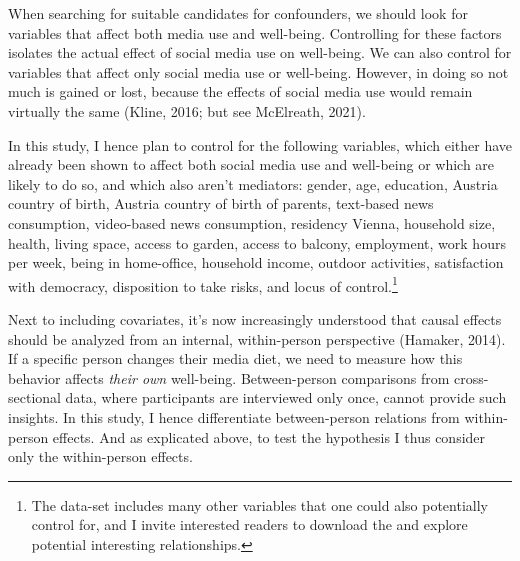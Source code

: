 \documentclass[
  man,mask]{apa7}
\begin{document}
When searching for suitable candidates for confounders, we should look for variables that affect both media use and well-being.
Controlling for these factors isolates the actual effect of social media use on well-being.
We can also control for variables that affect only social media use or well-being.
However, in doing so not much is gained or lost, because the effects of social media use would remain virtually the same (Kline, 2016; but see McElreath, 2021).

In this study, I hence plan to control for the following variables, which either have already been shown to affect both social media use and well-being or which are likely to do so, and which also aren't mediators:
gender, age, education, Austria country of birth, Austria country of birth of parents, text-based news consumption, video-based news consumption, residency Vienna, household size, health, living space, access to garden, access to balcony, employment, work hours per week, being in home-office, household income, outdoor activities, satisfaction with democracy, disposition to take risks, and locus of control.\footnote{The data-set includes many other variables that one could also potentially control for, and I invite interested readers to download the and explore potential interesting relationships.}

Next to including covariates, it's now increasingly understood that causal effects should be analyzed from an internal, within-person perspective (Hamaker, 2014).
If a specific person changes their media diet, we need to measure how this behavior affects \emph{their own} well-being.
Between-person comparisons from cross-sectional data, where participants are interviewed only once, cannot provide such insights.
In this study, I hence differentiate between-person relations from within-person effects.
And as explicated above, to test the hypothesis I thus consider only the within-person effects.
\end{document}
